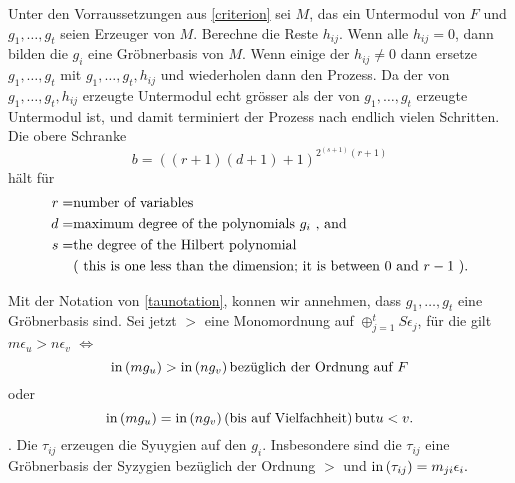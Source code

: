 \documentclass{article}
\begin{document}
\begin{algo}
	Unter den Vorraussetzungen aus \ref{criterion} 
	sei
	\( M \),
	das ein Untermodul von
	\( F \)
	und 
	\( g_{1},\dots,g_{t}\)
	seien  Erzeuger von 
	\( M \).
	Berechne die Reste
	\( h_{ij} \).
	Wenn alle 
	\( h_{ij} = 0 \),
	dann bilden die 
	\(g_{i} \)
	eine Gr\"obnerbasis von 
	\( M \).
	Wenn einige der 
	\( h_{ij} \neq 0 \)
	dann ersetze 
	\( g_{1},\dots,g_{t}\)
	mit 
	\( g_{1},\dots,g_{t},h_{ij} \)
	und wiederholen dann den Prozess.
	Da der von
	\( g_{1},\dots,g_{t},h_{ij} \)
	erzeugte Untermodul echt gr\"osser als der von
	\( g_{1},\dots,g_{t}\)
	erzeugte Untermodul ist, 
	und damit terminiert der Prozess nach endlich vielen Schritten.
	Die obere Schranke 
	\[
		b=\left( 
			\left( r+1 \right)
			\left( d+1 \right)+1 
		\right)^{2^{(s+1)}(r+1) }
	\]	
	h\"alt f\"ur
	\begin{align*}	
		r = &\text{number of variables} \\
		d = &\text{maximum degree of the polynomials \( g_i\) , and } \\
		s = &\text{the degree of the Hilbert polynomial } \\
		    &\text{( this is one less than the dimension; it is between \( 0 \) and \(r-1\) ).}
	\end{align*}

\end{algo}


\begin{thm}[Schreyer \cite{Eis1}[15.10]
	Mit der Notation von \ref{taunotation}, 
	konnen wir annehmen,
	dass
	\( g_1,\dots,g_t\)
	eine Gr\"obnerbasis sind.
	Sei jetzt 
	\( > \) 
	eine Monomordnung auf 
	\( \oplus_{j=1}^t S \epsilon_{j} \),
	f\"ur die gilt
	\( m \epsilon_{u} > n \epsilon_{v} \)
	\(\iff\)
	\[
		\operatorname{in}\left(  m g_{u} \right) > \operatorname{in}\left( n g_{v} \right) 
		\text{bez\"uglich der Ordnung auf } F 
	\]
	oder
	\[
		\operatorname{in}\left( m g_{u} \right) = \operatorname{in}\left( n g_{v} \right) 
		\left( \text{bis auf Vielfachheit} \right) \text{but} u < v.
	\].
	Die
	\( \tau_{ij} \) 
	erzeugen die Syuygien auf den
	\( g_{i} \).
	Insbesondere sind die
	\( \tau_{ij} \)
	eine Gr\"obnerbasis der Syzygien bez\"uglich der Ordnung
	\( > \)
	und 
	\( \operatorname{in}\left( \tau_{ij} \right) = m_{ji}\epsilon_{i}.\)
\end{thm}


\end{document}
